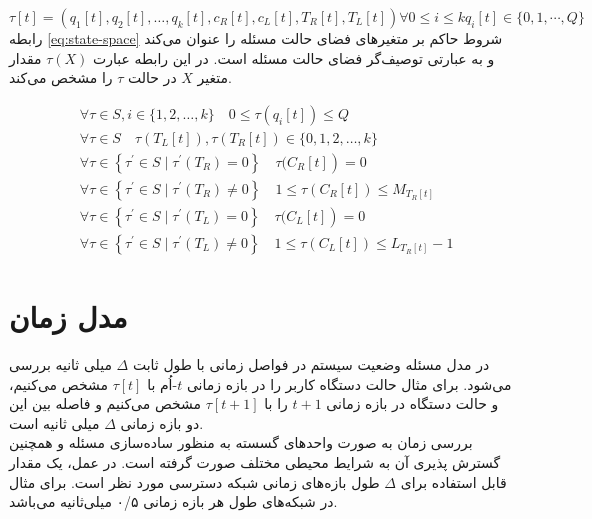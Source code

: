 \begin{equation}
	\label{eg:state}
	\tau[t]=\left(q_{1}[t], q_{2}[t], \ldots, q_{k}[t], c_{R}[t], c_{L}[t], T_{R}[t], T_{L}[t]\right)
	\forall 0 \leq i \leq k q_{i}[t] \in\{0,1, \cdots, Q\}
\end{equation}
رابطه \ref{eq:state-space} شروط حاکم بر متغیرهای فضای حالت مسئله را عنوان می‌کند و به عبارتی توصیف‌گر فضای حالت مسئله است. در این رابطه عبارت \(\tau(X)\) مقدار متغیر \(X\) در حالت \(\tau\) را مشخص می‌کند.

\begin{equation}
	\label{eq:state-space}
	\begin{aligned}
		&\forall \tau \in S, i \in \{1,2, \ldots, k\} \quad 0 \leqslant\tau\left(q_{i}[t]\right) \leqslant Q\\
		&\forall \tau \in S \quad  \tau\left(T_L[t]\right),  \tau\left(T_R[t]\right) \in \{0, 1,2, \ldots, k\}\\
		&\left.\forall \tau \in\left\{\tau^{\prime} \in S \mid \tau^{\prime}\left(T_{R}\right)=0\right\} \quad \tau(C_R[t]\right)=0\\
		&\forall \tau \in\left\{\tau^{\prime} \in S \mid \tau^{\prime}\left(T_{R}\right) \neq 0\right\} \quad 1 \leqslant \tau\left(C_{R}[t]\right) \leqslant M_{T_{R}[t]} \\
		&\left.\forall \tau \in\left\{\tau^{\prime} \in S \mid \tau^{\prime}\left(T_{L}\right)=0\right\} \quad \tau(C_L[t]\right)=0\\
		&\forall \tau \in\left\{\tau^{\prime} \in S \mid \tau^{\prime}\left(T_{L}\right) \neq 0\right\} \quad 1 \leqslant \tau\left(C_{L}[t]\right) \leqslant L_{T_{R}[t]} - 1
	\end{aligned}
\end{equation}

\newpage
\section{مدل زمان}
در مدل مسئله وضعیت سیستم در فواصل زمانی با طول ثابت \(\Delta\) میلی ثانیه بررسی می‌شود. برای مثال حالت دستگاه کاربر را در بازه زمانی \(t\)-اُم با \(\tau[t]\) مشخص می‌کنیم، و حالت دستگاه در بازه زمانی \(t + 1\) را با \(\tau[t + 1]\) مشخص می‌کنیم و فاصله بین این دو بازه زمانی \(\Delta\) میلی ثانیه است. \\

بررسی زمان به صورت واحدهای گسسته به منظور ساده‌سازی مسئله و همچنین گسترش پذیری آن به شرایط محیطی مختلف صورت گرفته است. در عمل، یک مقدار قابل استفاده برای \(\Delta\) طول بازه‌های زمانی شبکه دسترسی مورد نظر است. برای مثال در شبکه‌های  طول هر بازه زمانی ۰/۵ میلی‌ثانیه می‌باشد. \cite{LTE}

